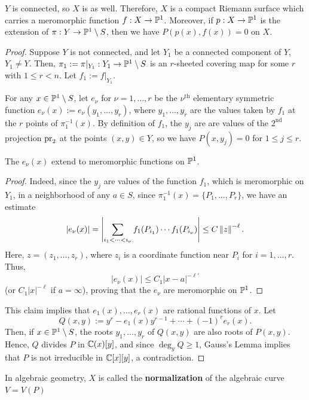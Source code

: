 \documentclass[11pt]{article}
\begin{document}
\begin{prop}
    $Y$ is connected, so $X$ is as well. Therefore, $X$ is a compact Riemann surface which carries a meromorphic function $f:X \to \P^1$. Moreover, if $p:X \to \P^1$ is the extension of $\pi:Y \to \P^1 \setminus S$, then we have $P(p(x),f(x))=0$ on $X$.
\end{prop}

\begin{proof}
    Suppose $Y$ is not connected, and let $Y_1$ be a connected component of $Y$, $Y_1 \neq Y$. Then, $\pi_1:= \pi|_{Y_1}:Y_1 \to \P^1 \setminus S$ is an $r$-sheeted covering map for some $r$ with $1 \leq r < n$. Let $f_1:=f|_{Y_1}$.

    For any $x \in \P^1 \setminus S$, let $e_\nu$ for $\nu=1,\dots,r$ be the $\nu^{\text{th}}$ elementary symmetric function $e_\nu(x):=e_\nu(y_1,\dots,y_r)$, where $y_1,\dots,y_r$ are the values taken by $f_1$ at the $r$ points of $\pi^{-1}_1(x)$. By definition of $f_1$, the $y_j$ are are values of the $2^{\text{nd}}$ projection $\w{pr}_2$ at the points $(x,y) \in Y$, so we have $P(x,y_j)=0$ for $1 \leq j \leq r$.

    \begin{claim}
        The $e_\nu(x)$ extend to meromorphic functions on $\P^1$.
    \end{claim}

    \begin{proof}
        Indeed, since the $y_j$ are values of the function $f_1$, which is meromorphic on $Y_1$, in a neighborhood of any $a \in S$, since $\pi_1^{-1}(x) = \{P_1,\dots,P_r\}$, we have an estimate
        $$|e_\nu(x)| = \abs{\sum_{i_1<\cdots < i_\nu} f_1(P_{i_1})\cdots f_1(P_{i_\nu})} \leq C \norm{z}^{-\ell}.$$
        Here, $z=(z_1,\dots,z_r)$, where $z_i$ is a coordinate function near $P_i$ for $i=1,\dots,r$. Thus,
        $$|e_\nu(x)| \leq C_1 |x-a|^{-\ell'}$$
        (or $C_1|x|^{-\ell}$ if $a = \infty$), proving that the $e_\nu$ are meromorphic on $\P^1$.
    \end{proof}
    This claim implies that $e_1(x),\dots,e_r(x)$ are rational functions of $x$. Let
    $$Q(x,y) := y^r-e_1(x)y^{r-1}+\cdots + (-1)^re_r(x).$$
    Then, if $x \in \P^1 \setminus S$, the roots $y_1,\dots,y_r$ of $Q(x,y)$ are also roots of $P(x,y)$. Hence, $Q$ divides $P$ in $\C(x)[y]$, and since $\deg_y Q\geq 1$, Gauss's Lemma implies that $P$ is not irreducible in $\C[x][y]$, a contradiction.
\end{proof}

\begin{defn}
    In algebraic geometry, $X$ is called the \textbf{normalization} of the algebraic curve $V=V(P)$
\end{defn}
\end{document}
